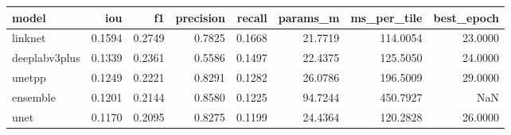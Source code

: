 \begin{tabular}{lrrrrrrr}
\toprule
model & iou & f1 & precision & recall & params_m & ms_per_tile & best_epoch \\
\midrule
linknet & 0.1594 & 0.2749 & 0.7825 & 0.1668 & 21.7719 & 114.0054 & 23.0000 \\
deeplabv3plus & 0.1339 & 0.2361 & 0.5586 & 0.1497 & 22.4375 & 125.5050 & 24.0000 \\
unetpp & 0.1249 & 0.2221 & 0.8291 & 0.1282 & 26.0786 & 196.5009 & 29.0000 \\
ensemble & 0.1201 & 0.2144 & 0.8580 & 0.1225 & 94.7244 & 450.7927 & NaN \\
unet & 0.1170 & 0.2095 & 0.8275 & 0.1199 & 24.4364 & 120.2828 & 26.0000 \\
\bottomrule
\end{tabular}
